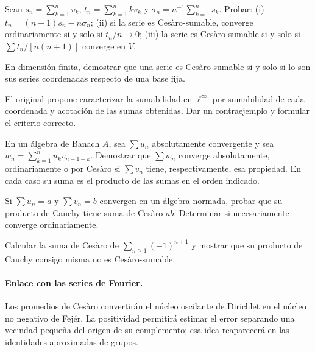 \begin{ejercicio}\label{ej:v4-l01-3}
Sean $s_n=\sum_{k=1}^nv_k$, $t_n=\sum_{k=1}^nkv_k$ y $\sigma_n=n^{-1}\sum_{k=1}^ns_k$. Probar: (i) $t_n=(n+1)s_n-n\sigma_n$; (ii) si la serie es Cesàro-sumable, converge ordinariamente si y solo si $t_n/n\to0$; (iii) la serie es Cesàro-sumable si y solo si $\sum t_n/[n(n+1)]$ converge en $V$.
\end{ejercicio}


\begin{ejercicio}\label{ej:v4-l01-4}
En dimensión finita, demostrar que una serie es Cesàro-sumable si y solo si lo son sus series coordenadas respecto de una base fija.
\end{ejercicio}


\begin{ejercicio}\label{ej:v4-l01-5}
El original propone caracterizar la sumabilidad en $\ell^\infty$ por sumabilidad de cada coordenada y acotación de las sumas obtenidas. Dar un contraejemplo y formular el criterio correcto.
\end{ejercicio}


\begin{ejercicio}\label{ej:v4-l01-6}
En un álgebra de Banach $A$, sea $\sum u_n$ absolutamente convergente y sea $w_n=\sum_{k=1}^nu_kv_{n+1-k}$. Demostrar que $\sum w_n$ converge absolutamente, ordinariamente o por Cesàro si $\sum v_n$ tiene, respectivamente, esa propiedad. En cada caso su suma es el producto de las sumas en el orden indicado.
\end{ejercicio}


\begin{ejercicio}\label{ej:v4-l01-7}
Si $\sum u_n=a$ y $\sum v_n=b$ convergen en un álgebra normada, probar que su producto de Cauchy tiene suma de Cesàro $ab$. Determinar si necesariamente converge ordinariamente.
\end{ejercicio}


\begin{ejercicio}\label{ej:v4-l01-8}
Calcular la suma de Cesàro de $\sum_{n\geq1}(-1)^{n+1}$ y mostrar que su producto de Cauchy consigo misma no es Cesàro-sumable.
\end{ejercicio}


\paragraph{Enlace con las series de Fourier.}
Los promedios de Cesàro convertirán el núcleo oscilante de Dirichlet en el núcleo no negativo de Fejér. La positividad permitirá estimar el error separando una vecindad pequeña del origen de su complemento; esa idea reaparecerá en las identidades aproximadas de grupos.
